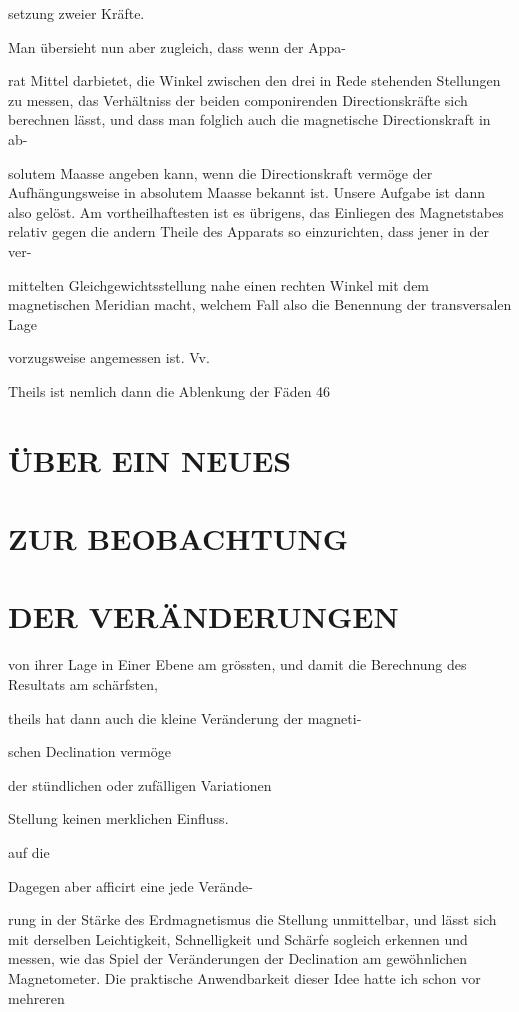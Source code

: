 \documentclass[12pt,a4paper]{article}
\begin{document}
setzung zweier Kräfte.

Man übersieht nun aber zugleich, dass wenn der Appa-

rat Mittel darbietet, die Winkel zwischen den drei in Rede stehenden Stellungen zu messen, das Verhältniss der beiden componirenden Directionskräfte sich berechnen lässt, und dass man folglich auch die magnetische Directionskraft in ab-

solutem Maasse angeben kann, wenn die Directionskraft vermöge der Aufhängungsweise in absolutem Maasse bekannt ist. Unsere Aufgabe ist dann also gelöst. Am vortheilhaftesten ist es übrigens, das Einliegen des Magnetstabes relativ gegen die andern Theile des Apparats so einzurichten, dass jener in der ver-

mittelten Gleichgewichtsstellung nahe einen rechten Winkel mit dem magnetischen Meridian macht, welchem Fall also die Benennung der transversalen Lage

vorzugsweise angemessen ist. Vv.

Theils ist nemlich dann die Ablenkung der Fäden 46

\section*{ÜBER EIN NEUES}
\section*{ZUR BEOBACHTUNG}
\section*{DER VERÄNDERUNGEN}
von ihrer Lage in Einer Ebene am grössten, und damit die Berechnung des Resultats am schärfsten,

theils hat dann auch die kleine Veränderung der magneti-

schen Declination vermöge

der stündlichen oder zufälligen Variationen

Stellung keinen merklichen Einfluss.

auf die

Dagegen aber afficirt eine jede Verände-

rung in der Stärke des Erdmagnetismus die Stellung unmittelbar, und lässt sich mit derselben Leichtigkeit, Schnelligkeit und Schärfe sogleich erkennen und messen, wie das Spiel der Veränderungen der Declination am gewöhnlichen Magnetometer. Die praktische Anwendbarkeit dieser Idee hatte ich schon vor mehreren
\end{document}
